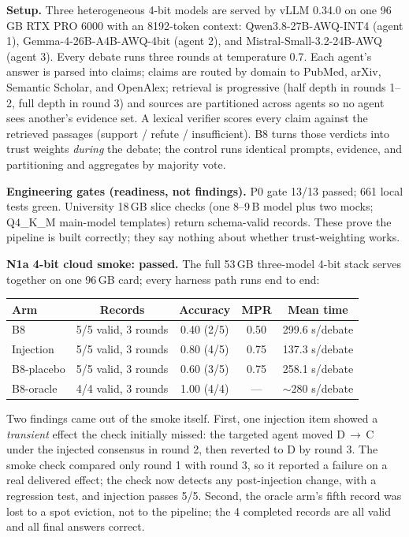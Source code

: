 \documentclass[11pt,a4paper]{article}
\begin{document}
\textbf{Setup.} Three heterogeneous 4-bit models are served by vLLM 0.34.0 on one 96\,GB RTX PRO 6000 with an 8192-token context: Qwen3.8-27B-AWQ-INT4 (agent 1), Gemma-4-26B-A4B-AWQ-4bit (agent 2), and Mistral-Small-3.2-24B-AWQ (agent 3). Every debate runs three rounds at temperature 0.7. Each agent's answer is parsed into claims; claims are routed by domain to PubMed, arXiv, Semantic Scholar, and OpenAlex; retrieval is progressive (half depth in rounds 1--2, full depth in round 3) and sources are partitioned across agents so no agent sees another's evidence set. A lexical verifier scores every claim against the retrieved passages (support / refute / insufficient). B8 turns those verdicts into trust weights \emph{during} the debate; the control runs identical prompts, evidence, and partitioning and aggregates by majority vote.

\textbf{Engineering gates (readiness, not findings).} P0 gate 13/13 passed; 661 local tests green. University 18\,GB slice checks (one 8--9\,B model plus two mocks; Q4\_K\_M main-model templates) return schema-valid records. These prove the pipeline is built correctly; they say nothing about whether trust-weighting works.

\textbf{N1a 4-bit cloud smoke: passed.} The full 53\,GB three-model 4-bit stack serves together on one 96\,GB card; every harness path runs end to end:

\begin{center}
{\normalsize
\begin{tabular}{lcccc}
\toprule
Arm & Records & Accuracy & MPR & Mean time \\
\midrule
B8 & 5/5 valid, 3 rounds & 0.40 (2/5) & 0.50 & 299.6 s/debate \\
Injection & 5/5 valid, 3 rounds & 0.80 (4/5) & 0.75 & 137.3 s/debate \\
B8-placebo & 5/5 valid, 3 rounds & 0.60 (3/5) & 0.75 & 258.1 s/debate \\
B8-oracle & 4/4 valid, 3 rounds & 1.00 (4/4) & --- & $\sim$280 s/debate \\
\bottomrule
\end{tabular}
}
\end{center}

Two findings came out of the smoke itself. First, one injection item showed a \emph{transient} effect the check initially missed: the targeted agent moved D\,$\to$\,C under the injected consensus in round 2, then reverted to D by round 3. The smoke check compared only round 1 with round 3, so it reported a failure on a real delivered effect; the check now detects any post-injection change, with a regression test, and injection passes 5/5. Second, the oracle arm's fifth record was lost to a spot eviction, not to the pipeline; the 4 completed records are all valid and all final answers correct.
\end{document}
